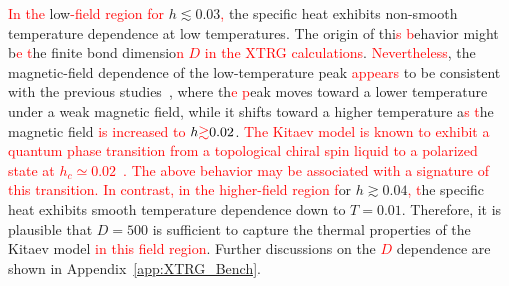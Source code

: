 \documentclass[twocolumn,superscriptaddress,showpacs, longbibliography, aps, prb]{revtex4-2}
\newcommand{\red}[1]{\textcolor{red}{#1}}
\begin{document}
\red{In the} low\red{-field region for} %
$h\lesssim 0.03$\red{,} %
the specific heat exhibits non-smooth temperature dependence at low temperatures. The origin of thi\red{s %
b}ehavior might b\red{e %
t}he finite bond dimensio\red{n %
$D$ in the XTRG calculations}. %
\red{Nevertheless}, the magnetic-field dependence of the low-temperature peak %
\red{appears} to be consistent with the %
previous studies~\cite{YoshitakeNKM2020,LiZWWGQLGL2021,LiLXGQLS2024}, where th\red{e %
p}eak moves toward a lower temperature %
under a weak magnetic field, while it %
shifts toward a higher temperature a\red{s %
t}he %
magnetic field \red{is increased to} %
$h %
\red{\gtrsim} 0.02$.
\red{The Kitaev model is known to exhibit a quantum phase transition from a topological chiral spin liquid to a polarized state at $h_c \simeq 0.02$~\cite{Jiang2011}. The above behavior may be associated with a signature of this transition.} 
%
%
\red{In contrast, in the higher-field region %
f}or $h \gtrsim 0.04$\red{, %
t}he specific heat %
exhibits smooth temperature dependence down to $T=0.01$. 
Therefore, it is plausible that $D=500$ is sufficient to %
capture the thermal properties of the
Kitaev model %
\red{in this field region}. 
Further discussions on the %
\red{$D$} dependence are shown in Appendix~\ref{app:XTRG_Bench}.
\end{document}
